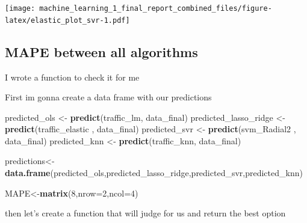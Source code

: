 \documentclass[
]{article}
\newenvironment{Shaded}{\begin{snugshade}}{\end{snugshade}}
\newcommand{\ControlFlowTok}[1]{\textcolor[rgb]{0.13,0.29,0.53}{\textbf{#1}}}
\newcommand{\DataTypeTok}[1]{\textcolor[rgb]{0.13,0.29,0.53}{#1}}
\newcommand{\DecValTok}[1]{\textcolor[rgb]{0.00,0.00,0.81}{#1}}
\newcommand{\KeywordTok}[1]{\textcolor[rgb]{0.13,0.29,0.53}{\textbf{#1}}}
\newcommand{\NormalTok}[1]{#1}
\newcommand{\OperatorTok}[1]{\textcolor[rgb]{0.81,0.36,0.00}{\textbf{#1}}}
\newcommand{\StringTok}[1]{\textcolor[rgb]{0.31,0.60,0.02}{#1}}
\begin{document}
\texttt{[image: machine\_learning\_1\_final\_report\_combined\_files/figure-latex/elastic\_plot\_svr-1.pdf]}

\hypertarget{mape-between-all-algorithms}{%
\subsection{MAPE between all
algorithms}\label{mape-between-all-algorithms}}

I wrote a function to check it for me

First im gonna create a data frame with our predictions

\begin{Shaded}
\begin{Highlighting}[]
\NormalTok{predicted_ols <-}\StringTok{ }\KeywordTok{predict}\NormalTok{(traffic_lm, data_final)}
\NormalTok{predicted_lasso_ridge <-}\StringTok{ }\KeywordTok{predict}\NormalTok{(traffic_elastic , data_final)}
\NormalTok{predicted_svr <-}\StringTok{ }\KeywordTok{predict}\NormalTok{(svm_Radial2 , data_final)}
\NormalTok{predicted_knn <-}\StringTok{ }\KeywordTok{predict}\NormalTok{(traffic_knn, data_final)}

\NormalTok{predictions<-}\KeywordTok{data.frame}\NormalTok{(predicted_ols,predicted_lasso_ridge,predicted_svr,predicted_knn)}

\NormalTok{MAPE<-}\KeywordTok{matrix}\NormalTok{(}\DecValTok{8}\NormalTok{,}\DataTypeTok{nrow=}\DecValTok{2}\NormalTok{,}\DataTypeTok{ncol=}\DecValTok{4}\NormalTok{)}
\end{Highlighting}
\end{Shaded}

then let's create a function that will judge for us and return the best
option

\begin{Shaded}
\end{Shaded}
\end{document}
